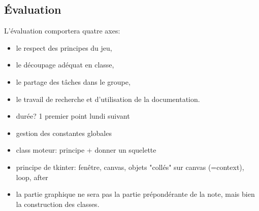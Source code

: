\documentclass[a4paper,11pt]{article}
\begin{document}
\begin{Form}
\section{Évaluation}
L'évaluation comportera quatre axes:
\begin{itemize}
\item le respect des principes du jeu,
\item le découpage adéquat en classe,
\item le partage des tâches dans le groupe,
\item le travail de recherche et d'utilisation de la documentation.
\end{itemize}
\begin{commentprof}
\begin{itemize}
\item durée? 1 premier point lundi suivant
\item gestion des constantes globales
\item class moteur: principe + donner un squelette
\item principe de tkinter: fenêtre, canvas, objets "collés" sur canvas (=context), loop, after
\item la partie graphique ne sera pas la partie prépondérante de la note, mais bien la construction des classes.
\end{itemize}
\end{commentprof}
\end{Form}
\end{document}
